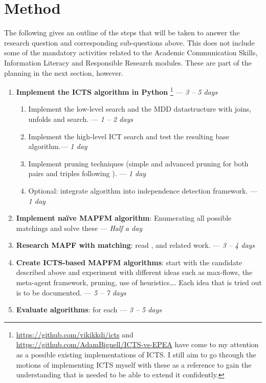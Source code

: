 \documentclass[a4paper,10pt,english]{article}
\begin{document}
	\section*{Method}
	The following gives an outline of the steps that will be taken to answer the research question and corresponding sub-questions above. This does not include some of the mandatory activities related to the Academic Communication Skills, Information Literacy and Responsible Research modules. These are part of the planning in the next section, however.
	\begin{enumerate}
		\item \textbf{Implement the ICTS algorithm in Python} \footnote{\url{https://github.com/vikikkdi/icts} and \url{https://github.com/AdamBignell/ICTS-vs-EPEA} have come to my attention as a possible existing implementations of ICTS. I still aim to go through the motions of implementing ICTS myself with these as a reference to gain the understanding that is needed to be able to extend it confidently.} --- \textit{3 -- 5 days}
		\begin{enumerate}
			\item Implement the low-level search and the MDD datastructure with joins, unfolds and search. --- \textit{1 -- 2 days}
			\item Implement the high-level ICT search and test the resulting base algorithm.--- \textit{1 day}
			\item Implement pruning techniques (simple and advanced pruning for both pairs and triples following \cite{sharon2011}). --- \textit{1 day}
			\item Optional: integrate algorithm into independence detection framework. --- \textit{1 day}
		\end{enumerate} 
		\item \textbf{Implement naïve MAPFM algorithm}: Enumerating all possible matchings and solve these --- \textit{Half a day}
		\item \textbf{Research MAPF with matching}: read \cite{ma2016},\cite{henkel2019} and related work. --- \textit{3 -- 4 days}
		\item \textbf{Create ICTS-based MAPFM algorithms}: start with the candidate described above and experiment with different ideas such as max-flows, the meta-agent framework, pruning, use of heuristics\ldots. Each idea that is tried out is to be documented.  --- \textit{5 -- 7 days}
		\item \textbf{Evaluate algorithms}: for each  --- \textit{3 -- 5 days}
		\begin{enumerate}

\end{enumerate}
\end{enumerate}
\end{document}
